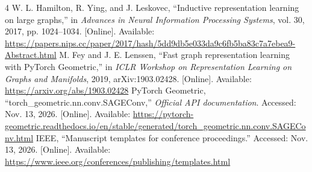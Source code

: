 \documentclass[a4paper,conference]{IEEEtran}
\begin{document}
\balance
\begin{thebibliography}{4}
 W. L. Hamilton, R. Ying, and J. Leskovec, ``Inductive representation learning on large graphs,'' in \emph{Advances in Neural Information Processing Systems}, vol. 30, 2017, pp. 1024--1034. [Online]. Available: \url{https://papers.nips.cc/paper/2017/hash/5dd9db5e033da9c6fb5ba83c7a7ebea9-Abstract.html}
 M. Fey and J. E. Lenssen, ``Fast graph representation learning with PyTorch Geometric,'' in \emph{ICLR Workshop on Representation Learning on Graphs and Manifolds}, 2019, arXiv:1903.02428. [Online]. Available: \url{https://arxiv.org/abs/1903.02428}
 PyTorch Geometric, ``torch\_geometric.nn.conv.SAGEConv,'' \emph{Official API documentation}. Accessed: Nov. 13, 2026. [Online]. Available: \url{https://pytorch-geometric.readthedocs.io/en/stable/generated/torch_geometric.nn.conv.SAGEConv.html}
 IEEE, ``Manuscript templates for conference proceedings.'' Accessed: Nov. 13, 2026. [Online]. Available: \url{https://www.ieee.org/conferences/publishing/templates.html}
\end{thebibliography}
\end{document}
